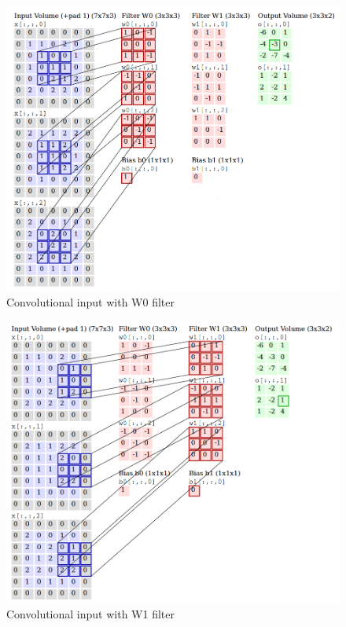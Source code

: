 \begin{figure}[!h]
	\centering
	\includegraphics[scale=0.35]{images/filter_w0}
	\caption{Convolutional input with W0 filter}
	\label{figconvw0}
\end{figure}
\begin{figure}[!h]
	\centering
	\includegraphics[scale=0.35]{images/filter_w1}
	\caption{Convolutional input with W1 filter}
	\label{figconvw1}
\end{figure}
